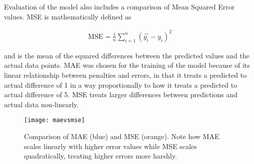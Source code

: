 Evaluation of the model also includes a comparison of Mean Squared Error values. MSE is mathematically defined as

\begin{align}
    \text{MSE} = \frac{1}{n} \sum\limits_{i=1}^{n} {(\hat{y_i} - y_i)^2}    
\end{align}

and is the mean of the squared differences between the predicted values and the actual data points. MAE was chosen for the training of the model because of its linear relationship between penalties and errors, in that it treats a predicted to actual difference of 1 in a way proportionally to how it treats a predicted to actual difference of 5. MSE treats larger differences between predictions and actual data non-linearly. 

\begin{figure}[H]
    \centering
    \texttt{[image: maevsmse]}
    \caption{Comparison of MAE (blue) and MSE (orange). Note how MAE scales linearly with higher error values while MSE scales quadratically, treating higher errors more harshly.}
    \label{tab:maevsmse}
\end{figure}
